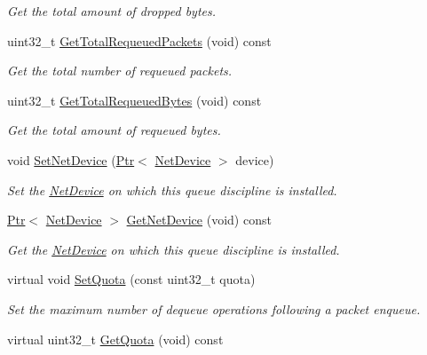 \begin{DoxyCompactItemize}
\begin{DoxyCompactList}\small\item\em Get the total amount of dropped bytes. \end{DoxyCompactList}\item 
uint32\+\_\+t \hyperlink{classns3_1_1QueueDisc_ab7a24479351628abd5c21d5c25d77038}{Get\+Total\+Requeued\+Packets} (void) const 
\begin{DoxyCompactList}\small\item\em Get the total number of requeued packets. \end{DoxyCompactList}\item 
uint32\+\_\+t \hyperlink{classns3_1_1QueueDisc_a401e7e3609c49327ca72b1e5d7b0fcbc}{Get\+Total\+Requeued\+Bytes} (void) const 
\begin{DoxyCompactList}\small\item\em Get the total amount of requeued bytes. \end{DoxyCompactList}\item 
void \hyperlink{classns3_1_1QueueDisc_af7dc06af070d01ff4cf515ab2a844ef3}{Set\+Net\+Device} (\hyperlink{classns3_1_1Ptr}{Ptr}$<$ \hyperlink{classns3_1_1NetDevice}{Net\+Device} $>$ device)
\begin{DoxyCompactList}\small\item\em Set the \hyperlink{classns3_1_1NetDevice}{Net\+Device} on which this queue discipline is installed. \end{DoxyCompactList}\item 
\hyperlink{classns3_1_1Ptr}{Ptr}$<$ \hyperlink{classns3_1_1NetDevice}{Net\+Device} $>$ \hyperlink{classns3_1_1QueueDisc_afae7bdc1c4f46a06bf31e269f832a41a}{Get\+Net\+Device} (void) const 
\begin{DoxyCompactList}\small\item\em Get the \hyperlink{classns3_1_1NetDevice}{Net\+Device} on which this queue discipline is installed. \end{DoxyCompactList}\item 
virtual void \hyperlink{classns3_1_1QueueDisc_ab35519e5f10b3226c4b2a07e009bcc20}{Set\+Quota} (const uint32\+\_\+t quota)
\begin{DoxyCompactList}\small\item\em Set the maximum number of dequeue operations following a packet enqueue. \end{DoxyCompactList}\item 
virtual uint32\+\_\+t \hyperlink{classns3_1_1QueueDisc_a1d058b896f93e346227a59c49085626e}{Get\+Quota} (void) const 

\end{DoxyCompactItemize}
